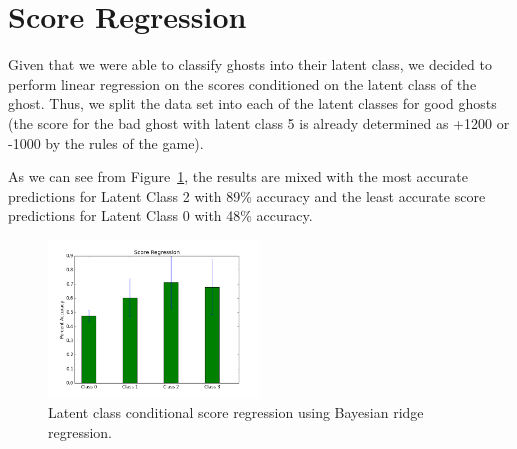 \documentclass[11pt]{amsart}
\begin{document}
\section{Score Regression}

Given that we were able to classify ghosts into their latent class, we decided to perform linear regression on the scores conditioned on the latent class of the ghost. Thus, we split the data set into each of the latent classes for good ghosts (the score for the bad ghost with latent class 5 is already determined as +1200 or -1000 by the rules of the game). 

As we can see from Figure~\ref{fig:score}, the results are mixed with the most accurate predictions for Latent Class 2 with 89\% accuracy and the least accurate score predictions for Latent Class 0 with 48\% accuracy.

\begin{figure}[b]
	\centering
	\includegraphics[width=0.5\textwidth]{score_regression.png}
	\caption{Latent class conditional score regression using Bayesian ridge regression.}
	\label{fig:score}
\end{figure}
\end{document}
